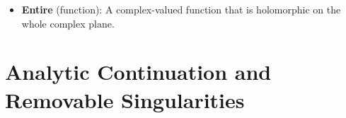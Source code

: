 \documentclass[../notes.tex]{subfiles}
\begin{document}
\begin{itemize}
\begin{proof}
        \begin{equation*}
            |f'(z)| \leq \frac{1}{R}\cdot\max_{\partial D}|f(\zeta)|
        \end{equation*}
        The maximum is bounded and $R$ is really big, so as $R\to\infty$, the derivative gets arbitrarily small. So if we've got an arbitrary function with zero derivative, then we've got a constant function.
    \end{proof}
    \item \textbf{Entire} (function): A complex-valued function that is holomorphic on the whole complex plane.
\end{itemize}



\section{Analytic Continuation and Removable Singularities}
\end{document}
